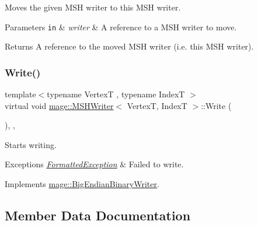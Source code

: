 Moves the given M\+SH writer to this M\+SH writer.


\begin{DoxyParams}[1]{Parameters}
\mbox{\tt in}  & {\em writer} & A reference to a M\+SH writer to move. \\
\hline
\end{DoxyParams}
\begin{DoxyReturn}{Returns}
A reference to the moved M\+SH writer (i.\+e. this M\+SH writer). 
\end{DoxyReturn}
\hypertarget{classmage_1_1_m_s_h_writer_ab97c9570c45bff97d88700d0dcf3ed75}{}\label{classmage_1_1_m_s_h_writer_ab97c9570c45bff97d88700d0dcf3ed75} 
\subsubsection{\texorpdfstring{Write()}{Write()}}
{\footnotesize\ttfamily template$<$typename VertexT , typename IndexT $>$ \\
virtual void \hyperlink{classmage_1_1_m_s_h_writer}{mage\+::\+M\+S\+H\+Writer}$<$ VertexT, IndexT $>$\+::Write (\begin{DoxyParamCaption}{ }\end{DoxyParamCaption})\hspace{0.3cm}{\ttfamily [override]}, {\ttfamily [private]}, {\ttfamily [virtual]}}

Starts writing.


\begin{DoxyExceptions}{Exceptions}
{\em \hyperlink{structmage_1_1_formatted_exception}{Formatted\+Exception}} & Failed to write. \\
\hline
\end{DoxyExceptions}


Implements \hyperlink{classmage_1_1_big_endian_binary_writer_ae6ee6613e629971502324cffc944795d}{mage\+::\+Big\+Endian\+Binary\+Writer}.



\subsection{Member Data Documentation}
\hypertarget{classmage_1_1_m_s_h_writer_a01cf9e635af683a1a9d6fa347b219dee}{}\label{classmage_1_1_m_s_h_writer_a01cf9e635af683a1a9d6fa347b219dee} 
